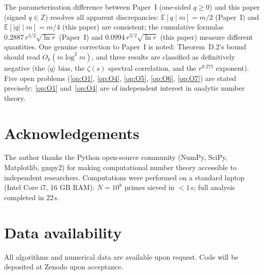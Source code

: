 \documentclass[11pt,a4paper]{article}
\theoremstyle{definition}
\theoremstyle{remark}
\newcommand{\Z}{\mathbb{Z}}
\newcommand{\E}{\mathbb{E}}
\begin{document}
\smallskip
The parameterisation difference between Paper~I (one-sided $q\ge 0$)
and this paper (signed $q\in\Z$) resolves all apparent
discrepancies: $\E[q\mid m]=m/2$ (Paper~I) and $\E[|q|\mid m]=m/4$
(this paper) are consistent; the cumulative formulas
$0.2887\,r^{3/2}\sqrt{\ln r}$ (Paper~I) and
$0.0994\,r^{3/2}\sqrt{\ln r}$ (this paper) measure different
quantities. One genuine correction to Paper~I is noted:
Theorem~D.2's bound should read $O_{k}(m\log^{2}m)$, and three
results are classified as definitively negative (the $\langle
q\rangle$ bias, the $\zeta(s)$ spectral correlation, and the
$r^{0.275}$ exponent). Five open problems
(\ref{op:O1}, \ref{op:O4}, \ref{op:O5}, \ref{op:O6}, \ref{op:O7})
are stated precisely; \ref{op:O1} and~\ref{op:O4} are of independent
interest in analytic number theory.

\section*{Acknowledgements}

The author thanks the Python open-source community (NumPy, SciPy,
Matplotlib, gmpy2) for making computational number theory accessible
to independent researchers. Computations were performed on a standard
laptop (Intel Core i7, 16 GB RAM): $N=10^{8}$ primes sieved in
$<1$\,s; full analysis completed in $22$\,s.

\section*{Data availability}

All algorithms and numerical data are available upon request. Code
will be deposited at Zenodo upon acceptance.
\end{document}
